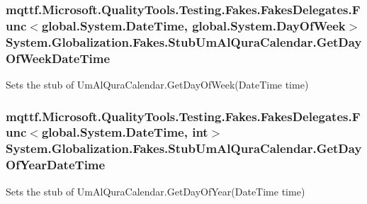 \hypertarget{class_system_1_1_globalization_1_1_fakes_1_1_stub_um_al_qura_calendar_a90167404bb64f14f6ad5e8902d9ea464}{
\subsubsection[{Get\-Day\-Of\-Week\-Date\-Time}]{\setlength{\rightskip}{0pt plus 5cm}mqttf.\-Microsoft.\-Quality\-Tools.\-Testing.\-Fakes.\-Fakes\-Delegates.\-Func$<$global.\-System.\-Date\-Time, global.\-System.\-Day\-Of\-Week$>$ System.\-Globalization.\-Fakes.\-Stub\-Um\-Al\-Qura\-Calendar.\-Get\-Day\-Of\-Week\-Date\-Time}}\label{class_system_1_1_globalization_1_1_fakes_1_1_stub_um_al_qura_calendar_a90167404bb64f14f6ad5e8902d9ea464}


Sets the stub of Um\-Al\-Qura\-Calendar.\-Get\-Day\-Of\-Week(\-Date\-Time time)

\hypertarget{class_system_1_1_globalization_1_1_fakes_1_1_stub_um_al_qura_calendar_ad074e0e4bb5672ace5626250751951f6}{
\subsubsection[{Get\-Day\-Of\-Year\-Date\-Time}]{\setlength{\rightskip}{0pt plus 5cm}mqttf.\-Microsoft.\-Quality\-Tools.\-Testing.\-Fakes.\-Fakes\-Delegates.\-Func$<$global.\-System.\-Date\-Time, int$>$ System.\-Globalization.\-Fakes.\-Stub\-Um\-Al\-Qura\-Calendar.\-Get\-Day\-Of\-Year\-Date\-Time}}\label{class_system_1_1_globalization_1_1_fakes_1_1_stub_um_al_qura_calendar_ad074e0e4bb5672ace5626250751951f6}


Sets the stub of Um\-Al\-Qura\-Calendar.\-Get\-Day\-Of\-Year(\-Date\-Time time)

